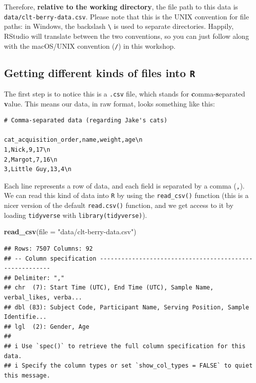 \documentclass[
]{book}
\newenvironment{Shaded}{\begin{snugshade}}{\end{snugshade}}
\newcommand{\AttributeTok}[1]{\textcolor[rgb]{0.13,0.29,0.53}{#1}}
\newcommand{\FunctionTok}[1]{\textcolor[rgb]{0.13,0.29,0.53}{\textbf{#1}}}
\newcommand{\NormalTok}[1]{#1}
\newcommand{\StringTok}[1]{\textcolor[rgb]{0.31,0.60,0.02}{#1}}
\begin{document}
Therefore, \textbf{relative to the working directory}, the file path to this data is \texttt{data/clt-berry-data.csv}. Please note that this is the UNIX convention for file paths: in Windows, the backslash \texttt{\textbackslash{}} is used to separate directories. Happily, RStudio will translate between the two conventions, so you can just follow along with the macOS/UNIX convention (\texttt{/}) in this workshop.

\hypertarget{getting-different-kinds-of-files-into-r}{%
\subsection{\texorpdfstring{Getting different kinds of files into \texttt{R}}{Getting different kinds of files into R}}\label{getting-different-kinds-of-files-into-r}}

The first step is to notice this is a \texttt{.csv} file, which stands for \textbf{c}omma-\textbf{s}eparated \textbf{v}alue. This means our data, in raw format, looks something like this:

\begin{verbatim}
# Comma-separated data (regarding Jake's cats)

cat_acquisition_order,name,weight,age\n
1,Nick,9,17\n
2,Margot,7,16\n
3,Little Guy,13,4\n
\end{verbatim}

Each line represents a row of data, and each field is separated by a comma (\texttt{,}). We can read this kind of data into \texttt{R} by using the \texttt{read\_csv()} function (this is a nicer version of the default \texttt{read.csv()} function, and we get access to it by loading \texttt{tidyverse} with \texttt{library(tidyverse)}).

\begin{Shaded}
\begin{Highlighting}[]
\FunctionTok{read\_csv}\NormalTok{(}\AttributeTok{file =} \StringTok{"data/clt{-}berry{-}data.csv"}\NormalTok{)}
\end{Highlighting}
\end{Shaded}

\begin{verbatim}
## Rows: 7507 Columns: 92
## -- Column specification --------------------------------------------------------
## Delimiter: ","
## chr  (7): Start Time (UTC), End Time (UTC), Sample Name, verbal_likes, verba...
## dbl (83): Subject Code, Participant Name, Serving Position, Sample Identifie...
## lgl  (2): Gender, Age
## 
## i Use `spec()` to retrieve the full column specification for this data.
## i Specify the column types or set `show_col_types = FALSE` to quiet this message.
\end{verbatim}
\end{document}
